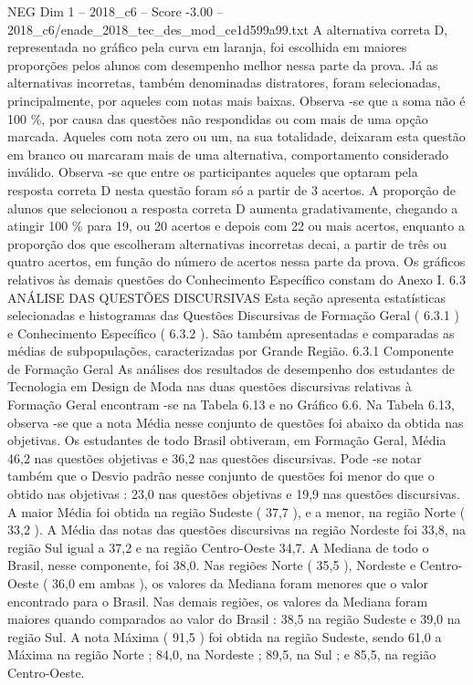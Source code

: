 \begin{textsample}{NEG Dim 1 – 2018\_c6 – Score -3.00 – 2018\_c6/enade\_2018\_tec\_des\_mod\_ce1d599a99.txt}
A alternativa correta D, representada no gráfico pela curva em laranja, foi escolhida em maiores proporções pelos alunos com desempenho melhor nessa parte da prova.
Já as alternativas incorretas, também denominadas distratores, foram selecionadas, principalmente, por aqueles com notas mais baixas.
Observa -se que a soma não é 100 \%, por causa das questões não respondidas ou com mais de uma opção marcada.
Aqueles com nota zero ou um, na sua totalidade, deixaram esta questão em branco ou marcaram mais de uma alternativa, comportamento considerado inválido.
Observa -se que entre os participantes aqueles que optaram pela resposta correta D nesta questão foram só a partir de 3 acertos.
A proporção de alunos que selecionou a resposta correta D aumenta gradativamente, chegando a atingir 100 \% para 19, ou 20 acertos e depois com 22 ou mais acertos, enquanto a proporção dos que escolheram alternativas incorretas decai, a partir de três ou quatro acertos, em função do número de acertos nessa parte da prova.
Os gráficos relativos às demais questões do Conhecimento Específico constam do Anexo I. 6.3 ANÁLISE DAS QUESTÕES DISCURSIVAS Esta seção apresenta estatísticas selecionadas e histogramas das Questões Discursivas de Formação Geral ( 6.3.1 ) e Conhecimento Específico ( 6.3.2 ).
São também apresentadas e comparadas as médias de subpopulações, caracterizadas por Grande Região. 6.3.1 Componente de Formação Geral As análises dos resultados de desempenho dos estudantes de Tecnologia em Design de Moda nas duas questões discursivas relativas à Formação Geral encontram -se na Tabela 6.13 e no Gráfico 6.6.
Na Tabela 6.13, observa -se que a nota Média nesse conjunto de questões foi abaixo da obtida nas objetivas.
Os estudantes de todo Brasil obtiveram, em Formação Geral, Média 46,2 nas questões objetivas e 36,2 nas questões discursivas.
Pode -se notar também que o Desvio padrão nesse conjunto de questões foi menor do que o obtido nas objetivas : 23,0 nas questões objetivas e 19,9 nas questões discursivas.
A maior Média foi obtida na região Sudeste ( 37,7 ), e a menor, na região Norte ( 33,2 ).
A Média das notas das questões discursivas na região Nordeste foi 33,8, na região Sul igual a 37,2 e na região Centro-Oeste 34,7.
A Mediana de todo o Brasil, nesse componente, foi 38,0.
Nas regiões Norte ( 35,5 ), Nordeste e Centro-Oeste ( 36,0 em ambas ), os valores da Mediana foram menores que o valor encontrado para o Brasil.
Nas demais regiões, os valores da Mediana foram maiores quando comparados ao valor do Brasil : 38,5 na região Sudeste e 39,0 na região Sul.
A nota Máxima ( 91,5 ) foi obtida na região Sudeste, sendo 61,0 a Máxima na região Norte ; 84,0, na Nordeste ; 89,5, na Sul ; e 85,5, na região Centro-Oeste.

\end{textsample}
